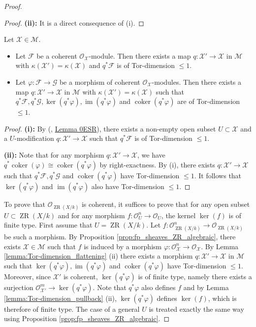 \documentclass [11pt,reqno]{amsart}
\newcommand{\1}{\mathmybb{1}}
\def\cF{{\mathcal{F}}}
\def\cG{{\mathcal{G}}}
\def\cM{{\mathcal{M}}}
\def\cO{{\mathcal{O}}}
\def\cX{{\mathcal{X}}}
\def\coker{\operatorname{coker}}
\def\im{\operatorname{im}}
\def\ZR{\operatorname{ZR}}
\begin{document}
\begin{proof}
\begin{proof}
\textbf{(ii):} It is a direct consequence of (i). 
\end{proof}

\begin{lemma}
\label{lemma:Tor-dimension_flattening}
Let $\cX\in \cM$. 
\begin{itemize}
	\item[(i)] Let $\cF$ be a coherent $\cO_{\cX}$-module. Then there exists a map $q:\cX'\to \cX$ in $\cM$ with $\kappa(\cX')=\kappa(\cX)$ and $q^{\ast}\cF$ is of Tor-dimension $\leq 1$.
	\item[(ii)] Let $\varphi : \cF \to \cG$ be a morphism of coherent $\cO_{\cX}$-modules. Then there exists a map $q:\cX'\to \cX$ in $\cM$ with $\kappa(\cX')=\kappa(\cX)$ such that $q^{\ast}\cF,q^{\ast}\cG,\ker(q^{\ast}\varphi),\im(q^{\ast}\varphi)$ and $\coker(q^{\ast}\varphi)$ are of Tor-dimension $\leq 1$.
\end{itemize}
\end{lemma}

\begin{proof}
\textbf{(i):} By (\cite{stacks}, \href{https://stacks.math.columbia.edu/tag/0ESR}{Lemma 0ESR}), there exists a non-empty open subset $U\subset \cX$ and a $U$-modification $q : \cX'\to \cX$ such that $q^{\ast}\cF$ is of Tor-dimension $\leq 1$.

\textbf{(ii):} Note that for any morphism $q:\cX'\to \cX$, we have $q^{\ast}\coker(\varphi)\cong \coker(q^{\ast}\varphi)$ by right-exactness. By (i), there exists $q:\cX'\to \cX$ such that $q^{\ast}\cF,q^{\ast}\cG$ and $\coker(q^{\ast}\varphi)$ have Tor-dimension $\leq 1$. It follows that $\ker(q^{\ast}\varphi)$ and $\im(q^{\ast}\varphi)$ also have Tor-dimension $\leq 1$. 
\end{proof}

To prove that $\cO_{\ZR(X/k)}$ is coherent, it suffices to prove that for any open subset $U\subset \ZR(X/k)$ and for any morphism $f: \cO_{U}^{n}\to \cO_{U}$, the kernel $\ker(f)$ is of finite type. First assume that $U=\ZR(X/k)$. Let $f:\cO_{\ZR(X/k)}^{n}\to \cO_{\ZR(X/k)}$ be such a morphism. By Proposition \ref{prop:fp_sheaves_ZR_algebraic}, there exists $\cX\in\cM$ such that $f$ is induced by a morphism $\varphi:\cO_{\cX}^{n}\to \cO_{\cX}$. By Lemma \ref{lemma:Tor-dimension_flattening} (ii) there exists a morphism $q:\cX'\to \cX$ in $\cM$ such that $\ker(q^{\ast}\varphi),\im(q^{\ast}\varphi)$ and $\coker(q^{\ast}\varphi)$ have Tor-dimension $\leq 1$. Moreover, since $\cX'$ is coherent, $\ker(q^{\ast}\varphi)$ is of finite type, namely there exists a surjection $\cO_{\cX'}^{m}\to \ker(q^{\ast}\varphi)$. Note that $q^{\ast}\varphi$ also defines $f$ and by Lemma \ref{lemma:Tor-dimension_pullback} (ii), $\ker(q^{\ast}\varphi)$ defines $\ker(f)$, which is therefore of finite type. The case of a general $U$ is treated exactly the same way using Proposition \ref{prop:fp_sheaves_ZR_algebraic}.
\end{proof}
\end{document}
